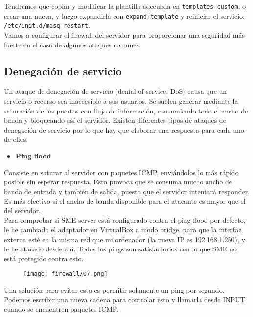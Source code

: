 Tendremos que copiar y modificar la plantilla adecuada en \lstinline!templates-custom!, o crear una nueva, y luego expandirla con \lstinline!expand-template! y reiniciar el servicio: \lstinline!/etc/init.d/masq restart!. \\

Vamos a configurar el firewall del servidor para proporcionar una seguridad más fuerte en el caso de algunos ataques comunes:

\subsection{Denegación de servicio}

Un ataque de denegación de servicio (denial-of-service, DoS) causa que un servicio o recurso sea inaccesible a sus usuarios. Se suelen generar mediante la saturación de los puertos con flujo de información, consumiendo todo el ancho de banda y bloqueando así el servidor. Existen diferentes tipos de ataques de denegación de servicio por lo que hay que elaborar una respuesta para cada uno de ellos.\\

\begin{itemize}
\item \textbf{Ping flood}
\end{itemize}

Consiste en saturar al servidor con paquetes ICMP, enviándolos lo más rápido posible sin esperar respuesta. Esto provoca que se consuma mucho ancho de banda de entrada y también de salida, puesto que el servidor intentará responder. Es más efectivo si el ancho de banda disponible para el atacante es mayor que el del servidor.\\

Para comprobar si SME server está configurado contra el ping flood por defecto, le he cambiado el adaptador en VirtualBox a modo bridge, para que la interfaz externa esté en la misma red que mi ordenador (la nueva IP es 192.168.1.250), y le he atacado desde ahí. Todos los pings son satisfactorios con lo que SME no está protegido contra esto.

\begin{figure}[H]
    \centering
    \texttt{[image: firewall/07.png]}
\end{figure}

Una solución para evitar esto es permitir solamente un ping por segundo. Podemos escribir una nueva cadena para controlar esto y llamarla desde INPUT cuando se encuentren paquetes ICMP.

